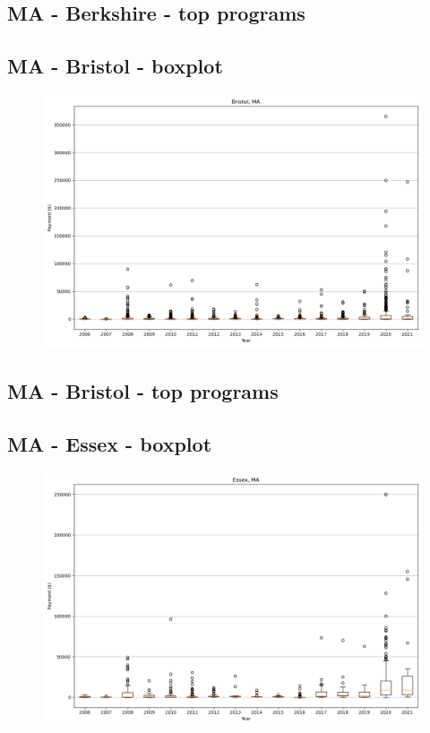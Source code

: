 \subsection*{MA - Berkshire - top programs}

\newpage
\subsection*{MA - Bristol - boxplot}
\begin{figure}[h]
\centering
\includegraphics[width=7in]{../output/boxplots/counties/Bristol-MA_boxplot.png}
\end{figure}


\subsection*{MA - Bristol - top programs}

\newpage
\subsection*{MA - Essex - boxplot}
\begin{figure}[h]
\centering
\includegraphics[width=7in]{../output/boxplots/counties/Essex-MA_boxplot.png}
\end{figure}


